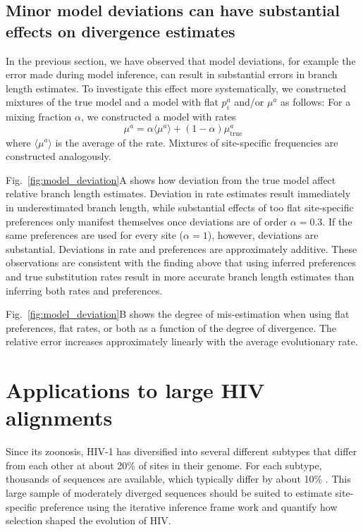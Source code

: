 \documentclass[aps,rmp,twocolumn,linenumbers]{revtex4-1}
\newcommand{\eqp}{p}
\begin{document}
\subsection*{Minor model deviations can have substantial effects on divergence estimates}
In the previous section, we have observed that model deviations, for example the error made during model inference, can result in substantial errors in branch length estimates.
To investigate this effect more systematically, we constructed mixtures of the true model and a model with flat $\eqp_i^a$ and/or $\mu^a$ as follows:
For a mixing fraction $\alpha$, we constructed a model with rates
\begin{equation}
\label{eq:mixture_model}
	\mu^a = \alpha \langle \mu^a\rangle + (1-\alpha) \mu^a_{\mathrm{true}}
\end{equation}
where $\langle \mu^a\rangle$ is the average of the rate.
Mixtures of site-specific frequencies are constructed analogously.

Fig.~\ref{fig:model_deviation}A shows how deviation from the true model affect relative branch length estimates.
Deviation in rate estimates result immediately in underestimated branch length, while substantial effects of too flat site-specific preferences only manifest themselves once deviations are of order $\alpha = 0.3$.
If the same preferences are used for every site ($\alpha=1$), however, deviations are substantial.
Deviations in rate and preferences are approximately additive.
These observations are consistent with the finding above that using inferred preferences and true substitution rates result in more accurate branch length estimates than inferring both rates and preferences.

Fig.~\ref{fig:model_deviation}B shows the degree of mis-estimation when using flat preferences, flat rates, or both as a function of the degree of divergence.
The relative error increases approximately linearly with the average evolutionary rate.


\section*{Applications to large HIV alignments}
Since its zoonosis, HIV-1 has diversified into several different subtypes that differ from each other at about 20\% of sites in their genome.
For each subtype, thousands of sequences are available, which typically differ by about 10\% \citep{LANL}.
This large sample of moderately diverged sequences should be suited to estimate site-specific preference using the iterative inference frame work and quantify how selection shaped the evolution of HIV.
\end{document}
